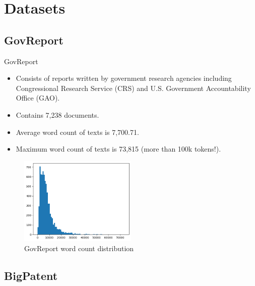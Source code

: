 \section{Datasets}


	\subsection{GovReport}

		\begin{frame}{GovReport}

			\begin{itemize}
				\item Consists of reports written by government research agencies including
				Congressional Research Service (CRS) and U.S. Government Accountability
				Office (GAO).
				\item Contains 7,238 documents.
				\item Average word count of texts is 7,700.71.
				\item Maximum word count of texts is 73,815 (more than 100k tokens!).
			\end{itemize}

			\begin{figure}
				\centering
				\includegraphics[width=0.5\textwidth]{../Report/Images/govreport-wordcount.png}
				\caption{GovReport word count distribution}
			\end{figure}
			
		\end{frame}


		\subsection{BigPatent}
		
